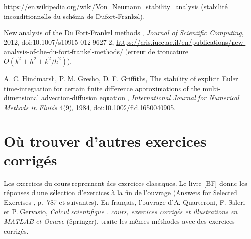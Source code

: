 \begin{description}[style=nextline,leftmargin=2.2cm,labelwidth=2cm]
    \url{https://en.wikipedia.org/wiki/Von_Neumann_stability_analysis}
    (stabilité inconditionnelle du schéma de Dufort-Frankel).
  \item[{[DF2]}] \og New analysis of the Du Fort-Frankel methods \fg,
    \textit{Journal of Scientific Computing}, 2012,
    doi:10.1007/s10915-012-9627-2,
    \url{https://cris.iucc.ac.il/en/publications/new-analysis-of-the-du-fort-frankel-methods/}
    (erreur de troncature $O(k^2 + h^2 + k^2/h^2)$).
  \item[{[HGG]}] A. C. Hindmarsh, P. M. Gresho, D. F. Griffiths, \og The
    stability of explicit Euler time-integration for certain finite difference
    approximations of the multi-dimensional advection-diffusion equation \fg,
    \textit{International Journal for Numerical Methods in Fluids} 4(9), 1984,
    doi:10.1002/fld.1650040905.
\end{description}

\section*{Où trouver d'autres exercices corrigés}

Les exercices du cours reprennent des exercices classiques. Le livre [BF]
donne les réponses d'une sélection d'exercices à la fin de l'ouvrage
(\og Answers for Selected Exercises \fg, p.~787 et suivantes). En français,
l'ouvrage d'A. Quarteroni, F. Saleri et P. Gervasio, \textit{Calcul
scientifique : cours, exercices corrigés et illustrations en MATLAB et Octave}
(Springer), traite les mêmes méthodes avec des exercices corrigés.
